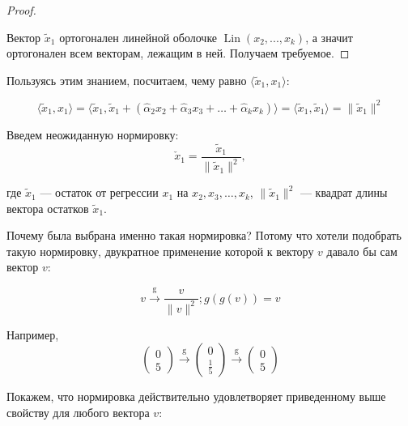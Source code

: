 \documentclass[12pt]{article} %
\theoremstyle{definition} %
\DeclareMathOperator{\Lin}{Lin}
\def \ha{\hat{\alpha}}
\def \tx{\tilde{x}}
\def \cx{\check{x}}
\begin{document}
\begin{proof}
\begin{center}
\end{center}

Вектор $\tx_1$ ортогонален линейной оболочке $\Lin \left(x_2, ..., x_k \right)$, а значит ортогонален всем векторам, лежащим в ней. Получаем требуемое.



\end{proof}

Пользуясь этим знанием, посчитаем, чему равно $\langle \tx_1, x_1 \rangle$:

\[
\langle \tx_1, x_1 \rangle = \langle \tx_1, \tx_1 + \left(\ha_2 x_2 + \ha_3 x_3 + \ldots + \ha_k x_k \right) \rangle = \langle \tx_1, \tx_1 \rangle = \| \tx_1 \|^2
\]

Введем неожиданную нормировку:
\[
\cx_1 = \frac{\tx_1}{\| \tx_1 \|^2},
\]

где $\tx_1$ — остаток от регрессии $x_1$ на $x_2, x_3, \dots, x_k$, $\| \tx_1 \|^2$ — квадрат длины вектора остатков $\tx_1$.


Почему была выбрана именно такая нормировка? Потому что хотели подобрать такую нормировку, двукратное применение которой к вектору $v$ давало бы сам вектор $v$:

\[
v \xrightarrow{\text{g}} \frac{v}{\| v \|^2};
g \left(g \left(v \right) \right) = v
\]

Например,
\[
\begin{pmatrix} 0 \\ 5 \end{pmatrix} \xrightarrow{\text{g}} \begin{pmatrix} 0 \\ \frac{1}{5} \end{pmatrix} \xrightarrow{\text{g}} \begin{pmatrix} 0 \\ 5 \end{pmatrix}
\]

Покажем, что нормировка действительно удовлетворяет приведенному выше свойству для любого вектора $v$:
\end{document}
